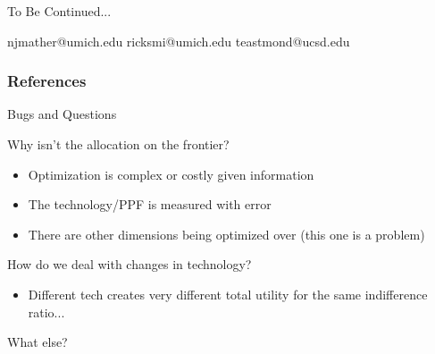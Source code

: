 \documentclass[t,aspectratio=169,11pt,presentation]{beamer}
\newenvironment{wideitemize}{\itemize\addtolength{\itemsep}{14pt}}{\enditemize}
\begin{document}


\begin{frame}[c,noframenumbering]
\centering
\Huge{\centerline{To Be Continued...}}
\normalsize njmather{\selectfont @}umich.edu \hspace{2em}
ricksmi{\selectfont @}umich.edu \hspace{2em} \normalsize teastmond{\selectfont @}ucsd.edu
\end{frame}



\begin{frame}[noframenumbering]
\frametitle{References}
\tiny

\end{frame}



\appendix


\begin{frame}{Bugs and Questions}

\begin{wideitemize}
     \item Why isn't the allocation on the frontier?
     \begin{itemize}
         \item Optimization is complex or costly given information
         \item The technology/PPF is measured with error
         \item There are other dimensions being optimized over  (this one is a problem)
     \end{itemize}
   \item How do we deal with changes in technology?
        \begin{itemize}
         \item Different tech creates very different total utility for the same indifference ratio...
     \end{itemize}
   
   \item What else?
\end{wideitemize}
\end{frame}
\end{document}
